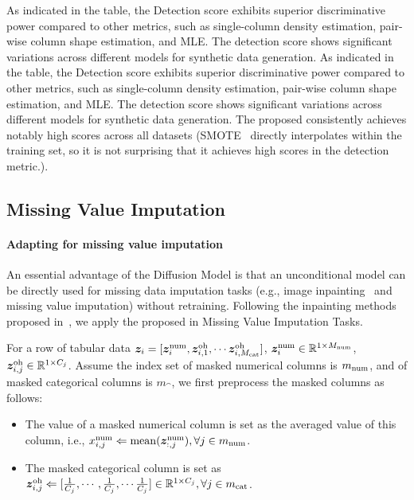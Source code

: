 As indicated in the table, the Detection score exhibits superior discriminative power compared to other metrics, such as single-column density estimation, pair-wise column shape estimation, and MLE. The detection score shows significant variations across different models for synthetic data generation. As indicated in the table, the Detection score exhibits superior discriminative power compared to other metrics, such as single-column density estimation, pair-wise column shape estimation, and MLE. The detection score shows significant variations across different models for synthetic data generation. The proposed \modelname consistently achieves notably high scores across all datasets (SMOTE~\citep{smote} directly interpolates within the training set, so it is not surprising that it achieves high scores in the detection metric.).


\subsection{Missing Value Imputation}\label{appendix:imputation}

\paragraph{Adapting \modelname for missing value imputation}
An essential advantage of the Diffusion Model is that an unconditional model can be directly used for missing data imputation tasks (e.g., image inpainting~\citep{vp, repaint} and missing value imputation) without retraining. Following the inpainting methods proposed in~\cite{repaint}, we apply the proposed \modelname in Missing Value Imputation Tasks.

For a row of tabular data ${\bm{z}}_i = [{\bm{z}}_i^{{\rm num}}, {\bm{z}}^{{\rm oh}}_{i,1}, \cdots {\bm{z}}^{{\rm oh}}_{i, M_{{\rm cat}}}]$, ${\bm{z}}_i^{{\rm num}} \in {\mathbb{R}}^{1\times M_{{\rm num}}}$, ${\bm{z}}^{{\rm oh}}_{i,j} \in {\mathbb{R}}^{1\times C_j}$. Assume the index set of masked numerical columns is ${m}_{{\rm num}}$, and of masked categorical columns is ${m}_{\cat}$, we first preprocess the masked columns as follows:
\begin{itemize}
    \item The value of a masked numerical column is set as the averaged value of this column, i.e., $x^{{\rm num}}_{i,j} \Leftarrow {\rm mean} ({\bm{z}}_{:, j}^{{\rm num}}), \forall j \in {m}_{{\rm num}}$.
    \item The masked categorical column is set as ${\bm{z}}_{i,j}^{{\rm oh}} \Leftarrow [\frac{1}{C_j}, \cdots,  \frac{1}{C_j}, \cdots \frac{1}{C_j}] \in {\mathbb{R}}^{1\times C_j}, \forall j \in {m}_{{\rm cat}}$.
\end{itemize}

